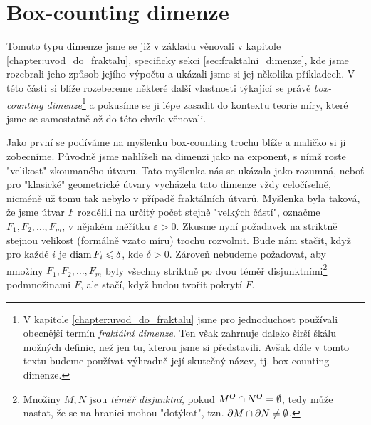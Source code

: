 \section{Box-counting dimenze}\label{sec:box-counting-dimenze}

Tomuto typu dimenze jsme se již v základu věnovali v kapitole \ref{chapter:uvod_do_fraktalu}, specificky sekci \ref{sec:fraktalni_dimenze}, kde jsme rozebrali jeho způsob jejího výpočtu a ukázali jsme si jej několika příkladech. V této části si blíže rozebereme některé další vlastnosti týkající se právě \emph{box-counting dimenze}\footnote{V kapitole \ref{chapter:uvod_do_fraktalu} jsme pro jednoduchost používali obecnější termín \emph{fraktální dimenze}. Ten však zahrnuje daleko širší škálu možných definic, než jen tu, kterou jsme si představili. Avšak dále v tomto textu budeme používat výhradně její skutečný název, tj. box-counting dimenze.} a pokusíme se ji lépe zasadit do kontextu teorie míry, které jsme se samostatně až do této chvíle věnovali.

Jako první se podíváme na myšlenku box-counting trochu blíže a maličko si ji zobecníme. Původně jsme nahlíželi na dimenzi jako na exponent, s nímž roste "velikost" zkoumaného útvaru. Tato myšlenka nás se ukázala jako rozumná, neboť pro "klasické" geometrické útvary vycházela tato dimenze vždy celočíselně, nicméně už tomu tak nebylo v případě fraktálních útvarů. Myšlenka byla taková, že jsme útvar $F$ rozdělili na určitý počet stejně "velkých částí", označme $F_1,F_2,\ldots,F_m$, v nějakém měřítku $\varepsilon>0$. Zkusme nyní požadavek na striktně stejnou velikost (formálně vzato míru) trochu rozvolnit. Bude nám stačit, když pro každé $i$ je $\operatorname{diam}{F_i}\leqslant\delta$, kde $\delta>0$. Zároveň nebudeme požadovat, aby množiny $F_1,F_2,\ldots,F_m$ byly všechny striktně po dvou téměř disjunktními\footnote{Množiny $M,N$ jsou \emph{téměř disjunktní}, pokud $M^O\cap N^O=\emptyset$, tedy může nastat, že se na hranici mohou "dotýkat", tzn. $\partial M\cap\partial N\neq\emptyset$.} podmnožinami $F$, ale stačí, když budou tvořit pokrytí $F$.

